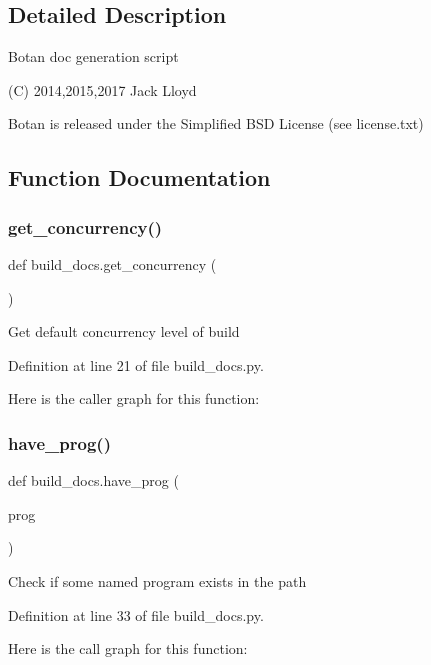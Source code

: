 \subsection{Detailed Description}
\begin{DoxyVerb}Botan doc generation script

(C) 2014,2015,2017 Jack Lloyd

Botan is released under the Simplified BSD License (see license.txt)
\end{DoxyVerb}
 

\subsection{Function Documentation}
\mbox{\label{namespacebuild__docs_adc33ba22722439845484b6f22b983e27}} 
\subsubsection{\texorpdfstring{get\+\_\+concurrency()}{get\_concurrency()}}
{\footnotesize\ttfamily def build\+\_\+docs.\+get\+\_\+concurrency (\begin{DoxyParamCaption}{ }\end{DoxyParamCaption})}

\begin{DoxyVerb}Get default concurrency level of build
\end{DoxyVerb}
 

Definition at line 21 of file build\+\_\+docs.\+py.

Here is the caller graph for this function\+:
\mbox{\label{namespacebuild__docs_a9f47a32b0a2d2f838741524fd454bd83}} 
\subsubsection{\texorpdfstring{have\+\_\+prog()}{have\_prog()}}
{\footnotesize\ttfamily def build\+\_\+docs.\+have\+\_\+prog (\begin{DoxyParamCaption}\item[{}]{prog }\end{DoxyParamCaption})}

\begin{DoxyVerb}Check if some named program exists in the path
\end{DoxyVerb}
 

Definition at line 33 of file build\+\_\+docs.\+py.

Here is the call graph for this function\+:
